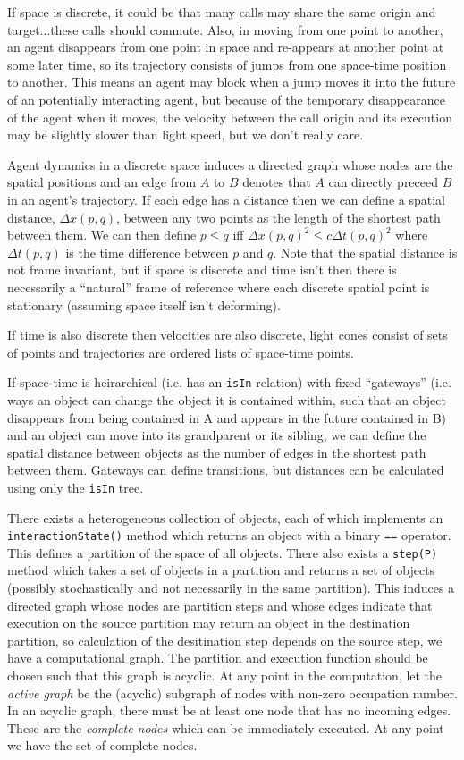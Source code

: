 \documentclass[a4paper]{article}
\begin{document}
If space is discrete, it could be that many calls may share the same origin and target...these calls should commute. Also, in moving from one point to another, an agent disappears from one point in space and re-appears at another point at some later time, so its trajectory consists of jumps from one space-time position to another. This means an agent may block when a jump moves it into the future of an potentially interacting agent, but because of the temporary disappearance of the agent when it moves, the velocity between the call origin and its execution may be slightly slower than light speed, but we don't really care.

Agent dynamics in a discrete space induces a directed graph whose nodes are the spatial positions and an edge from $A$ to $B$ denotes that $A$ can directly preceed $B$ in an agent's trajectory. If each edge has a distance then we can define a spatial distance, $\Delta x(p,q)$, between any two points as the length of the shortest path between them. We can then define $p \le q$ iff $\Delta x(p,q)^2 \le c\Delta t(p,q)^2$ where $\Delta t(p,q)$ is the time difference between $p$ and $q$. Note that the spatial distance is not frame invariant, but if space is discrete and time isn't then there is necessarily a ``natural'' frame of reference where each discrete spatial point is stationary (assuming space itself isn't deforming).

If time is also discrete then velocities are also discrete, light cones consist of sets of points and trajectories are ordered lists of space-time points.

If space-time is heirarchical (i.e. has an \texttt{isIn} relation) with fixed ``gateways'' (i.e. ways an object can change the object it is contained within, such that an object disappears from being contained in A and appears in the future contained in B) and an object can move into its grandparent or its sibling, we can define the spatial distance between objects as the number of edges in the shortest path between them. Gateways can define transitions, but distances can be calculated using only the \texttt{isIn} tree.  

There exists a heterogeneous collection of objects, each of which implements an \texttt{interactionState()} method which returns an object with a binary \texttt{==} operator. This defines a partition of the space of all objects. There also exists a \texttt{step(P)} method which takes a set of objects in a partition and returns a set of objects (possibly stochastically and not necessarily in the same partition). This induces a directed graph whose nodes are partition steps and whose edges indicate that execution on the source partition may return an object in the destination partition, so calculation of the desitination step depends on the source step, we have a computational graph. The partition and execution function should be chosen such that this graph is acyclic. At any point in the computation, let the \textit{active graph} be the (acyclic) subgraph of nodes with non-zero occupation number. In an acyclic graph, there must be at least one node that has no incoming edges. These are the \textit{complete nodes} which can be immediately executed. At any point we have the set of complete nodes.
\end{document}
